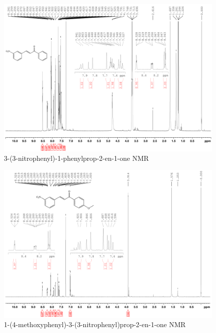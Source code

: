 \documentclass[11pt]{article}
\begin{document}
\newpage
\begin{figure}[H]
    \centering
    \includegraphics[scale=0.105]{spectra/nmr7.1.png}
    \caption{3-(3-nitrophenyl)-1-phenylprop-2-en-1-one NMR}
\end{figure}
\begin{figure}[H]
    \centering
    \includegraphics[scale=0.105]{spectra/nmr7.2.png}
    \caption{1-(4-methoxyphenyl)-3-(3-nitrophenyl)prop-2-en-1-one NMR}
\end{figure}
\end{document}
